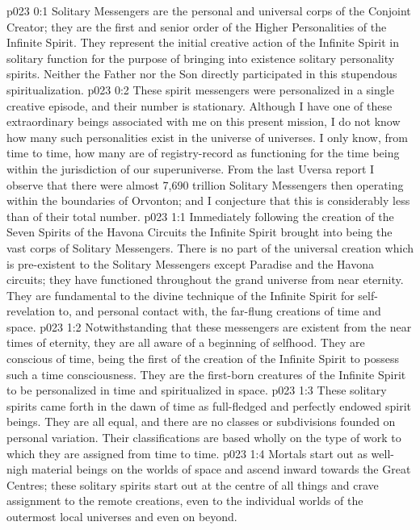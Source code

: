\author{Divine Counsellor}
\vs p023 0:1 Solitary Messengers are the personal and universal corps of the Conjoint Creator; they are the first and senior order of the Higher Personalities of the Infinite Spirit. They represent the initial creative action of the Infinite Spirit in solitary function for the purpose of bringing into existence solitary personality spirits. Neither the Father nor the Son directly participated in this stupendous spiritualization.
\vs p023 0:2 These spirit messengers were personalized in a single creative episode, and their number is stationary. Although I have one of these extraordinary beings associated with me on this present mission, I do not know how many such personalities exist in the universe of universes. I only know, from time to time, how many are of registry\hyp{}record as functioning for the time being within the jurisdiction of our superuniverse. From the last Uversa report I observe that there were almost 7,690 trillion Solitary Messengers then operating within the boundaries of Orvonton; and I conjecture that this is considerably less than  of their total number.
\vs p023 1:1 Immediately following the creation of the Seven Spirits of the Havona Circuits the Infinite Spirit brought into being the vast corps of Solitary Messengers. There is no part of the universal creation which is pre\hyp{}existent to the Solitary Messengers except Paradise and the Havona circuits; they have functioned throughout the grand universe from near eternity. They are fundamental to the divine technique of the Infinite Spirit for self\hyp{}revelation to, and personal contact with, the far\hyp{}flung creations of time and space.
\vs p023 1:2 Notwithstanding that these messengers are existent from the near times of eternity, they are all aware of a beginning of selfhood. They are conscious of time, being the first of the creation of the Infinite Spirit to possess such a time consciousness. They are the first\hyp{}born creatures of the Infinite Spirit to be personalized in time and spiritualized in space.
\vs p023 1:3 These solitary spirits came forth in the dawn of time as full\hyp{}fledged and perfectly endowed spirit beings. They are all equal, and there are no classes or subdivisions founded on personal variation. Their classifications are based wholly on the type of work to which they are assigned from time to time.
\vs p023 1:4 Mortals start out as well\hyp{}nigh material beings on the worlds of space and ascend inward towards the Great Centres; these solitary spirits start out at the centre of all things and crave assignment to the remote creations, even to the individual worlds of the outermost local universes and even on beyond.
